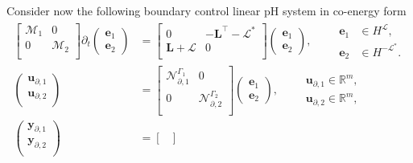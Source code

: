 Consider now the following boundary control linear pH system in co-energy form 
\begin{subequations}
	\label{eq:pHlinsys_mixed}
\begin{align}
\begin{bmatrix}
\mathcal{M}_1 & 0 \\
0 & \mathcal{M}_2 \\
\end{bmatrix}
\partial_t \begin{pmatrix}
\bm{e}_1 \\ \bm{e}_2
\end{pmatrix} &= \begin{bmatrix}
0 & -\bm{L}^\top - \mathcal{L}^* \\
\bm{L} + \mathcal{L} & 0 \\
\end{bmatrix}\begin{pmatrix}
\bm{e}_1 \\ \bm{e}_2
\end{pmatrix} , \qquad \begin{aligned}
\bm{e}_1 &\in H^{\mathcal{L}}, 	\\
\bm{e}_2 &\in H^{-\mathcal{L}^*}.
\end{aligned} \label{eq:pHlinsys_dyn_mixed}\\
\begin{pmatrix}
\bm{u}_{\partial, 1}\\
\bm{u}_{\partial, 2}\\
\end{pmatrix} &= \begin{bmatrix}
\mathcal{N}_{\partial, 1}^{\Gamma_1} & 0\\
0 & \mathcal{N}_{\partial, 2}^{\Gamma_2} \\
\end{bmatrix} \begin{pmatrix}
\bm{e}_1 \\ \bm{e}_2
\end{pmatrix}, \qquad 
\begin{aligned}
\bm{u}_{\partial, 1} \in \mathbb{R}^{m},\\
\bm{u}_{\partial, 2} \in \mathbb{R}^{m},
\end{aligned} \\
\begin{pmatrix}
\bm{y}_{\partial, 1}\\
\bm{y}_{\partial, 2}\\
\end{pmatrix} &= \begin{bmatrix}

\end{bmatrix}
\end{align}
\end{subequations}
